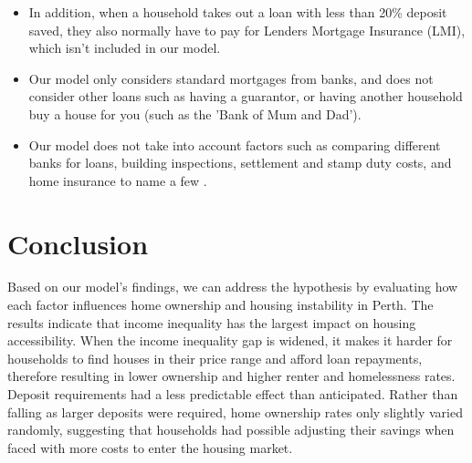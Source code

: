\documentclass[11pt]{article}
\begin{document}
\begin{itemize}
  \item In addition, when a household takes out a loan 
  with less than 20\% deposit saved, they also normally have to pay for Lenders
  Mortgage Insurance (LMI)\cite{canstarlmi}, which isn't included in our model.
  \item Our model only considers standard mortgages from banks, and does not consider
  other loans such as having a guarantor, or having another household buy a house
  for you (such as the 'Bank of Mum and Dad'). 
  \item Our model does not take into account factors such as comparing
  different banks for loans, building inspections, settlement and stamp duty costs, and
  home insurance to name a few \cite{moneysmartbuying}. 
\end{itemize}

\section{Conclusion}
Based on our model's findings, we can address the hypothesis by evaluating how 
each factor influences home ownership and housing instability in Perth.
The results indicate that income inequality has the largest impact on housing accessibility. When
the income inequality gap is widened, it makes it harder for households to find 
houses in their price range and afford loan repayments, therefore resulting in lower 
ownership and higher renter and homelessness rates. 
Deposit requirements had a less predictable effect than anticipated. Rather than
falling as larger deposits were required, home ownership rates only slightly varied randomly, 
suggesting that households had possible adjusting their savings when faced with more costs
to enter the housing market.
\end{document}
